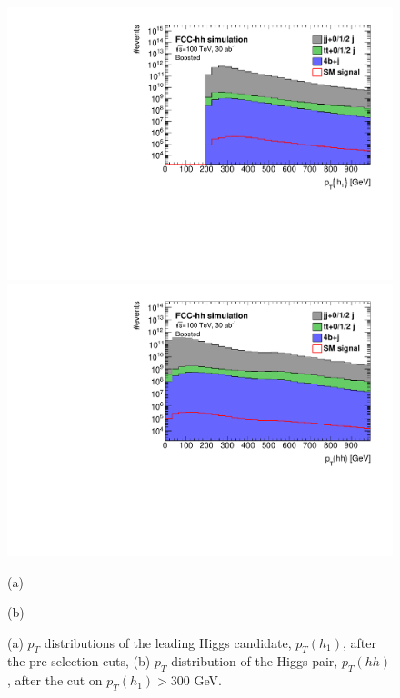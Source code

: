 \begin{figure}
	\centering
	\begin{minipage}{.5\textwidth}
		\centering
		\includegraphics[width=\linewidth]{./images/hist_h1_pt_stack.pdf}
	\end{minipage}%
	\begin{minipage}{.5\textwidth}
		\centering
		\includegraphics[width=\linewidth]{./images/hist_hh_pt_stack.pdf}
	\end{minipage}
	\begin{minipage}[t]{0.5\textwidth}
		\caption*{(a)}
	\end{minipage}%
	\hfill
	\begin{minipage}[t]{0.5\textwidth}
		\caption*{(b)}
	\end{minipage}
	\caption{(a) $p_T$ distributions of the leading Higgs candidate, $p_T(h_1)$, after the pre-selection cuts, (b) $p_T$ distribution of the Higgs pair, $p_T(hh)$, after the cut on $p_T(h_1)>300$ GeV.}
	\label{fig:pt_stack}
\end{figure}

